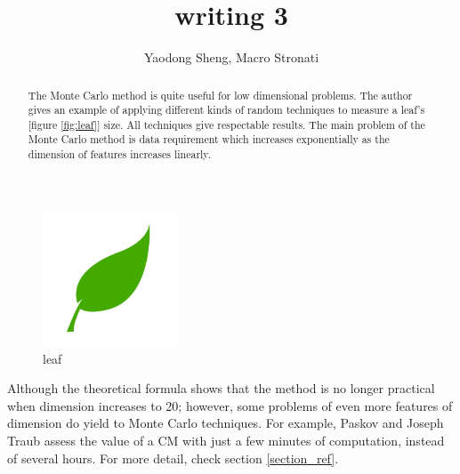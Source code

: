 \documentclass[10pt]{article}
\begin{document}
\title{\Large writing 3}
\author{Yaodong Sheng, Macro Stronati}
\date{}
\maketitle
\begin{abstract}
The Monte Carlo method is quite useful for low dimensional problems. The author gives an example of applying different kinds of random techniques to measure a leaf’s [figure \ref{fig:leaf}] size. All techniques give respectable results. The main problem of the Monte Carlo method is data requirement which increases exponentially as the dimension of features increases linearly. 
\end{abstract}

\section{}

\subsection{}
\par 

\begin{figure}[h]
\centering
\includegraphics[width=4cm]{leaf.jpg}
\caption{leaf}
\label{fig:leaf}
\end{figure}

Although the theoretical formula shows that the method is no longer practical when dimension increases to 20; however,  some problems of even more features of dimension do yield to Monte Carlo techniques. For example, Paskov and Joseph Traub assess the value of a CM with just a few minutes of computation, instead of several hours. For more detail, check section \ref{section_ref}.
\end{document}
